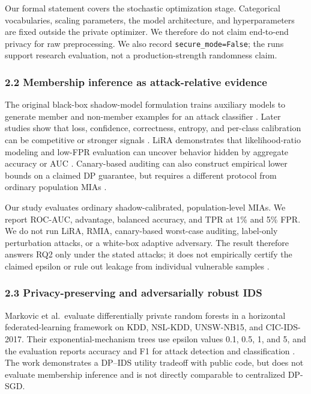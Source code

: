 \documentclass[11pt,a4paper]{article}
\begin{document}
Our formal statement covers the stochastic optimization stage.
Categorical vocabularies, scaling parameters, the model architecture,
and hyperparameters are fixed outside the private optimizer. We
therefore do not claim end-to-end privacy for raw preprocessing. We also
record \texttt{secure\_mode=False}; the runs support research
evaluation, not a production-strength randomness claim.

\hypertarget{membership-inference-as-attack-relative-evidence}{%
\subsubsection{2.2 Membership inference as attack-relative
evidence}\label{membership-inference-as-attack-relative-evidence}}

The original black-box shadow-model formulation trains auxiliary models
to generate member and non-member examples for an attack classifier
\citep{shokri2017membership}. Later studies show that loss, confidence,
correctness, entropy, and per-class calibration can be competitive or
stronger signals \citep{song2021systematic}. LiRA demonstrates that
likelihood-ratio modeling and low-FPR evaluation can uncover behavior
hidden by aggregate accuracy or AUC \citep{carlini2022membership}.
Canary-based auditing can also construct empirical lower bounds on a
claimed DP guarantee, but requires a different protocol from ordinary
population MIAs \citep{steinke2023privacy}.

Our study evaluates ordinary shadow-calibrated, population-level MIAs.
We report ROC-AUC, advantage, balanced accuracy, and TPR at 1\% and 5\%
FPR. We do not run LiRA, RMIA, canary-based worst-case auditing,
label-only perturbation attacks, or a white-box adaptive adversary. The
result therefore answers RQ2 only under the stated attacks; it does not
empirically certify the claimed epsilon or rule out leakage from
individual vulnerable samples \citep{aerni2024evaluations}.

\hypertarget{privacy-preserving-and-adversarially-robust-ids}{%
\subsubsection{2.3 Privacy-preserving and adversarially robust
IDS}\label{privacy-preserving-and-adversarially-robust-ids}}

Markovic et al.~evaluate differentially private random forests in a
horizontal federated-learning framework on KDD, NSL-KDD, UNSW-NB15, and
CIC-IDS-2017. Their exponential-mechanism trees use epsilon values 0.1,
0.5, 1, and 5, and the evaluation reports accuracy and F1 for attack
detection and classification \citep{markovic2024random}. The work
demonstrates a DP--IDS utility tradeoff with public code, but does not
evaluate membership inference and is not directly comparable to
centralized DP-SGD.
\end{document}
